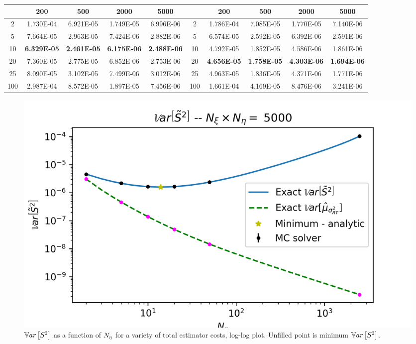 \begin{landscape}
\begin{table}[]
\begin{tabular}{|c|cccc||c|cccc|}
	   	& 200 		& 500 		& 2000 		& 5000 		&		& 200 			& 500 			& 2000 			& 5000 \\ \hline
	2	& 1.730E-04	& 6.921E-05	& 1.749E-05	& 6.996E-06	& 2		& 1.786E-04		& 7.085E-05		& 1.770E-05		& 7.140E-06 \\
	5	& 7.664E-05	& 2.963E-05	& 7.424E-06	& 2.882E-06	& 5		& 6.574E-05		& 2.592E-05		& 6.392E-06 		& 2.591E-06 \\
	10	& \textbf{6.329E-05}	& \textbf{2.461E-05}	& \textbf{6.175E-06} & \textbf{2.488E-06} & 10 & 4.792E-05	& 1.852E-05 	& 4.586E-06	& 1.861E-06 \\
	20	& 7.360E-05	& 2.775E-05	& 6.852E-06	& 2.753E-06	& 20		& \textbf{4.656E-05} & \textbf{1.758E-05}		& \textbf{4.303E-06} & \textbf{1.694E-06} \\
	25	& 8.090E-05	& 3.102E-05	& 7.499E-06	& 3.012E-06	& 25 	& 4.963E-05		& 1.836E-05		& 4.371E-06		& 1.771E-06 \\
	100	& 2.987E-04	& 8.572E-05 	& 1.897E-05	& 7.456E-06	& 100	& 1.661E-04		& 4.169E-05		& 8.476E-06		& 3.241E-06 \\
	\hline
	\end{tabular}
\end{table}
\end{landscape}

\begin{figure}[ht]
    \centering
    \includegraphics[width=\textwidth]{Figures/log-log.png}
    \caption{$\mathbb{V}ar\left[S^2\right]$ as a function of ${N_\eta}$ for a variety of total estimator costs, log-log plot. Unfilled point is minimum $\mathbb{V}ar\left[S^2\right]$. }
    \label{fig:log-log}
\end{figure}

